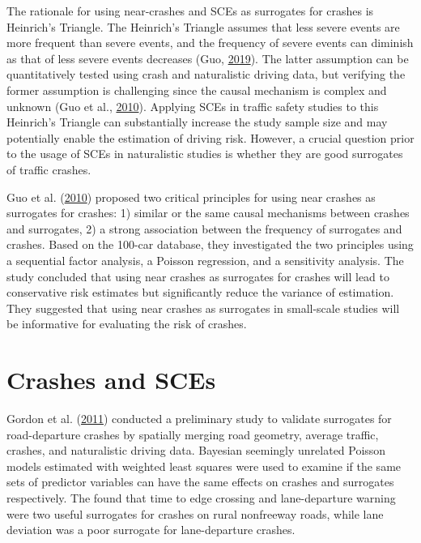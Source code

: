 \documentclass[12pt]{book}
\numberwithin{equation}{chapter}
\begin{document}
The rationale for using near-crashes and SCEs as surrogates for crashes is Heinrich's Triangle. The Heinrich's Triangle assumes that less severe events are more frequent than severe events, and the frequency of severe events can diminish as that of less severe events decreases (Guo, \protect\hyperlink{ref-guo2019statistical}{2019}). The latter assumption can be quantitatively tested using crash and naturalistic driving data, but verifying the former assumption is challenging since the causal mechanism is complex and unknown (Guo et al., \protect\hyperlink{ref-guo2010near}{2010}). Applying SCEs in traffic safety studies to this Heinrich's Triangle can substantially increase the study sample size and may potentially enable the estimation of driving risk. However, a crucial question prior to the usage of SCEs in naturalistic studies is whether they are good surrogates of traffic crashes.

Guo et al. (\protect\hyperlink{ref-guo2010near}{2010}) proposed two critical principles for using near crashes as surrogates for crashes: 1) similar or the same causal mechanisms between crashes and surrogates, 2) a strong association between the frequency of surrogates and crashes. Based on the 100-car database, they investigated the two principles using a sequential factor analysis, a Poisson regression, and a sensitivity analysis. The study concluded that using near crashes as surrogates for crashes will lead to conservative risk estimates but significantly reduce the variance of estimation. They suggested that using near crashes as surrogates in small-scale studies will be informative for evaluating the risk of crashes.

\hypertarget{crashes-and-sces}{%
\section{Crashes and SCEs}\label{crashes-and-sces}}

Gordon et al. (\protect\hyperlink{ref-gordon2011analysis}{2011}) conducted a preliminary study to validate surrogates for road-departure crashes by spatially merging road geometry, average traffic, crashes, and naturalistic driving data. Bayesian seemingly unrelated Poisson models estimated with weighted least squares were used to examine if the same sets of predictor variables can have the same effects on crashes and surrogates respectively. The found that time to edge crossing and lane-departure warning were two useful surrogates for crashes on rural nonfreeway roads, while lane deviation was a poor surrogate for lane-departure crashes.
\end{document}
